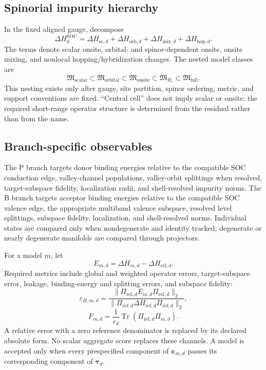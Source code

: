 \documentclass[11pt]{article}
\newenvironment{prospective}{\color{prospectivered}}{}
\begin{document}
\begin{prospective}
\subsection{Spinorial impurity hierarchy}
In the fixed aligned gauge, decompose
\begin{equation}
 \Delta H_d^{\mathrm{SOC}}
 =\Delta H_{\mathrm{sc},d}
 +\Delta H_{\mathrm{orb},d}
 +\Delta H_{\mathrm{mix},d}
 +\Delta H_{\mathrm{hop},d}.
\end{equation}
The terms denote scalar onsite, orbital- and spinor-dependent onsite, onsite mixing, and
nonlocal hopping/hybridization changes. The nested model classes are
\begin{equation}
 \mathfrak M_{\mathrm{scalar}}
 \subset\mathfrak M_{\mathrm{orbital}}
 \subset\mathfrak M_{\mathrm{onsite}}
 \subset\mathfrak M_{R_c}
 \subset\mathfrak M_{\mathrm{full}}.
\end{equation}
This nesting exists only after gauge, site partition, spinor ordering, metric, and support
conventions are fixed. ``Central cell'' does not imply scalar or onsite: the required
short-range operator structure is determined from the residual rather than from the
name.

\subsection{Branch-specific observables}
The P branch targets donor binding energies relative to the compatible SOC conduction
edge, valley-channel populations, valley-orbit splittings when resolved, target-subspace
fidelity, localization radii, and shell-resolved impurity norms. The B branch targets
acceptor binding energies relative to the compatible SOC valence edge, the appropriate
multiband valence subspace, resolved level splittings, subspace fidelity, localization,
and shell-resolved norms. Individual states are compared only when nondegenerate and
identity tracked; degenerate or nearly degenerate manifolds are compared through
projectors.

For a model $m$, let
\begin{equation}
 E_{m,d}=\Delta H_{m,d}-\Delta H_{\mathrm{ref},d}.
\end{equation}
Required metrics include global and weighted operator errors, target-subspace error,
leakage, binding-energy and splitting errors, and subspace fidelity:
\begin{equation}
 \varepsilon_{\Pi,m,d}
 =\frac{\lVert\Pi_{\mathrm{ref},d}E_{m,d}\Pi_{\mathrm{ref},d}\rVert_2}
 {\lVert\Pi_{\mathrm{ref},d}\Delta H_{\mathrm{ref},d}
 \Pi_{\mathrm{ref},d}\rVert_2},
\end{equation}
\begin{equation}
 F_{m,d}=\frac{1}{r_d}\operatorname{Tr}
 \left(\Pi_{\mathrm{ref},d}\Pi_{m,d}\right).
\end{equation}
A relative error with a zero reference denominator is replaced by its declared absolute
form. No scalar aggregate score replaces these channels. A model is accepted only when
every prespecified component of $\boldsymbol\varepsilon_{m,d}$ passes its corresponding
component of $\boldsymbol\tau_d$.


\end{prospective}
\end{document}
